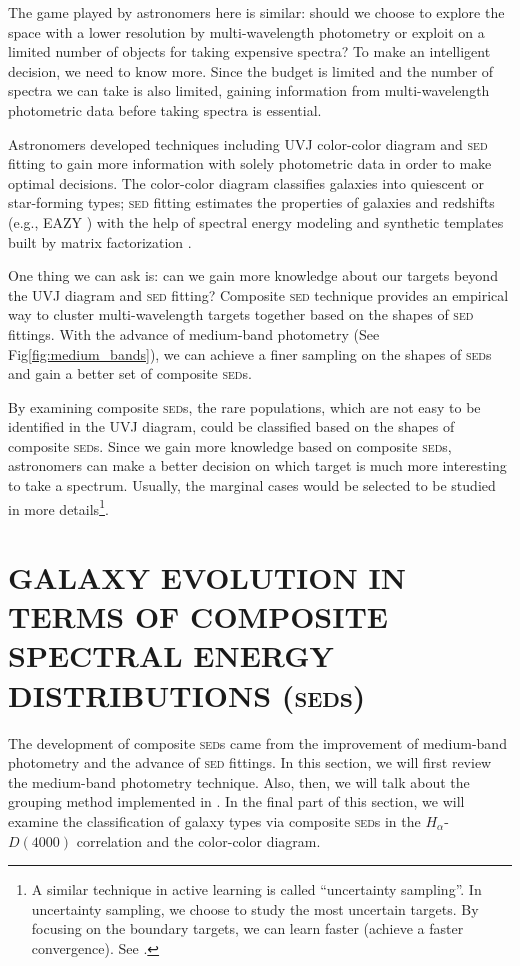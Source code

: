 \documentclass{ar-1col}
\begin{document}
The game played by astronomers here is similar: should we choose to explore the space with a lower resolution by multi-wavelength photometry or exploit on a limited number of objects for taking expensive spectra?
To make an intelligent decision, we need to know more.
Since the budget is limited and the number of spectra we can take is also limited, gaining information from multi-wavelength photometric data before taking spectra is essential.

Astronomers developed techniques including UVJ color-color diagram and \textsc{sed} fitting to gain more information with solely photometric data in order to make optimal decisions.
The color-color diagram classifies galaxies into quiescent or star-forming types; \textsc{sed} fitting estimates the properties of galaxies and redshifts (e.g., EAZY \citep{Brammer2008}) with the help of spectral energy modeling and synthetic templates built by matrix factorization \citep{Blanton2007}.

One thing we can ask is: can we gain more knowledge about our targets beyond the UVJ diagram and \textsc{sed} fitting?
Composite \textsc{sed} technique \citep{Kriek2011, Forrest2018} provides an empirical way to cluster multi-wavelength targets together based on the shapes of \textsc{sed} fittings.
With the advance of medium-band photometry (See Fig\ref{fig:medium_bands}), we can achieve a finer sampling on the shapes of \textsc{sed}s and gain a better set of composite \textsc{sed}s.

By examining composite \textsc{sed}s, the rare populations, which are not easy to be identified in the UVJ diagram, could be classified based on the shapes of composite \textsc{sed}s.
Since we gain more knowledge based on composite \textsc{sed}s, astronomers can make a better decision on which target is much more interesting to take a spectrum.
Usually, the marginal cases would be selected to be studied in more details\footnote{A similar technique in active learning is called ``uncertainty sampling''. In uncertainty sampling, we choose to study the most uncertain targets. By focusing on the boundary targets, we can learn faster (achieve a faster convergence). See \citet{Garnett18}.}.


\section{GALAXY EVOLUTION IN TERMS OF COMPOSITE SPECTRAL ENERGY DISTRIBUTIONS (\textsc{sed}s)}

The development of composite \textsc{sed}s came from the improvement of medium-band photometry and the advance of \textsc{sed} fittings. 
In this section, we will first review the medium-band photometry technique.
Also, then, we will talk about the grouping method implemented in \citep{Kriek2011, Forrest2018}.
In the final part of this section, we will examine the classification of galaxy types via composite \textsc{sed}s in the $H_\alpha$-$D(4000)$ correlation and the color-color diagram.
\end{document}
